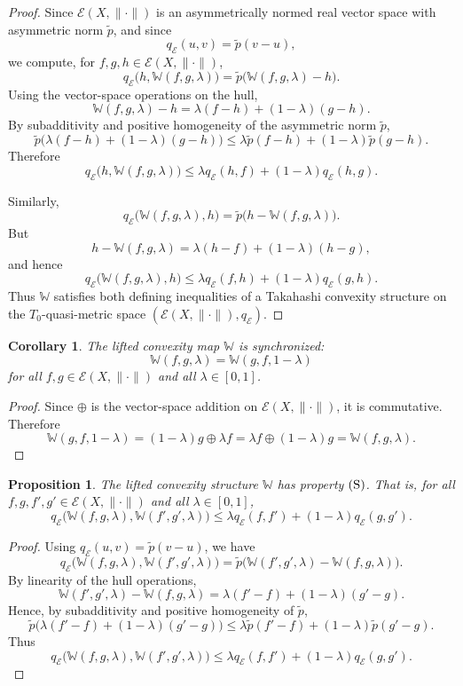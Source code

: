 \documentclass[preprint,12pt]{elsarticle}
\numberwithin{equation}{section}
\newtheorem{proposition}[theorem]{Proposition}
\newtheorem{corollary}[theorem]{Corollary}
\newcommand{\E}{\mathcal{E}}
\begin{document}
\begin{proof}
Since \(\E(X,\|\cdot\|)\) is an asymmetrically normed real vector space with
asymmetric norm \(\widetilde p\), and since
\[
q_{\E}(u,v)=\widetilde p(v-u),
\]
we compute, for \(f,g,h\in\E(X,\|\cdot\|)\),
\[
q_{\E}\bigl(h,\mathbb W(f,g,\lambda)\bigr)
=
\widetilde p\bigl(\mathbb W(f,g,\lambda)-h\bigr).
\]
Using the vector-space operations on the hull,
\[
\mathbb W(f,g,\lambda)-h
=
\lambda(f-h)+(1-\lambda)(g-h).
\]
By subadditivity and positive homogeneity of the asymmetric norm
\(\widetilde p\),
\[
\widetilde p\bigl(\lambda(f-h)+(1-\lambda)(g-h)\bigr)
\le
\lambda\widetilde p(f-h)+(1-\lambda)\widetilde p(g-h).
\]
Therefore
\[
q_{\E}\bigl(h,\mathbb W(f,g,\lambda)\bigr)
\le
\lambda q_{\E}(h,f)+(1-\lambda)q_{\E}(h,g).
\]

Similarly,
\[
q_{\E}\bigl(\mathbb W(f,g,\lambda),h\bigr)
=
\widetilde p\bigl(h-\mathbb W(f,g,\lambda)\bigr).
\]
But
\[
h-\mathbb W(f,g,\lambda)
=
\lambda(h-f)+(1-\lambda)(h-g),
\]
and hence
\[
q_{\E}\bigl(\mathbb W(f,g,\lambda),h\bigr)
\le
\lambda q_{\E}(f,h)+(1-\lambda)q_{\E}(g,h).
\]
Thus \(\mathbb W\) satisfies both defining inequalities of a Takahashi
convexity structure on the \(T_{0}\)-quasi-metric space
\((\E(X,\|\cdot\|),q_{\E})\).
\end{proof}

\begin{corollary}\label{cor:WliftSynchronized}
The lifted convexity map \(\mathbb W\) is synchronized:
\[
\mathbb W(f,g,\lambda)=\mathbb W(g,f,1-\lambda)
\]
for all \(f,g\in\E(X,\|\cdot\|)\) and all \(\lambda\in[0,1]\).
\end{corollary}

\begin{proof}
Since \(\oplus\) is the vector-space addition on \(\E(X,\|\cdot\|)\), it is
commutative.  Therefore
\[
\mathbb W(g,f,1-\lambda)
=
(1-\lambda)g\oplus \lambda f
=
\lambda f\oplus(1-\lambda)g
=
\mathbb W(f,g,\lambda).
\]
\end{proof}

\begin{proposition}\label{prop:WliftS}
The lifted convexity structure \(\mathbb W\) has property \({\rm(S)}\).  That
is, for all \(f,g,f',g'\in\E(X,\|\cdot\|)\) and all \(\lambda\in[0,1]\),
\[
q_{\E}\bigl(\mathbb W(f,g,\lambda),\mathbb W(f',g',\lambda)\bigr)
\le
\lambda q_{\E}(f,f')+(1-\lambda)q_{\E}(g,g').
\]
\end{proposition}

\begin{proof}
Using \(q_{\E}(u,v)=\widetilde p(v-u)\), we have
\[
q_{\E}\bigl(\mathbb W(f,g,\lambda),\mathbb W(f',g',\lambda)\bigr)
=
\widetilde p\bigl(\mathbb W(f',g',\lambda)-\mathbb W(f,g,\lambda)\bigr).
\]
By linearity of the hull operations,
\[
\mathbb W(f',g',\lambda)-\mathbb W(f,g,\lambda)
=
\lambda(f'-f)+(1-\lambda)(g'-g).
\]
Hence, by subadditivity and positive homogeneity of \(\widetilde p\),
\[
\widetilde p\bigl(\lambda(f'-f)+(1-\lambda)(g'-g)\bigr)
\le
\lambda\widetilde p(f'-f)+(1-\lambda)\widetilde p(g'-g).
\]
Thus
\[
q_{\E}\bigl(\mathbb W(f,g,\lambda),\mathbb W(f',g',\lambda)\bigr)
\le
\lambda q_{\E}(f,f')+(1-\lambda)q_{\E}(g,g').
\]
\end{proof}
\end{document}
